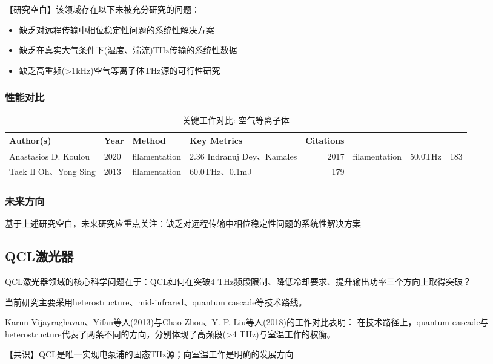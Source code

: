 \documentclass[reprint,amsmath,amssymb,aps,floatfix]{revtex4-2}
\begin{document}
\par\par{【研究空白】该领域存在以下未被充分研究的问题：}
\begin{itemize}
\item 缺乏对远程传输中相位稳定性问题的系统性解决方案
\item 缺乏在真实大气条件下(湿度、湍流)THz传输的系统性数据
\item 缺乏高重频(>1kHz)空气等离子体THz源的可行性研究
\end{itemize}

\subsubsection*{性能对比}
\begin{table}[h!]
\caption{关键工作对比: 空气等离子体}
\begin{tabular}{@{}llp{2.5cm}p{2.5cm}r@{}}
\hline
Author(s) & Year & Method & Key Metrics & Citations\\
\hline
Anastasios D. Koulou & 2020 & filamentation & 2.36%
Indranuj Dey、Kamales & 2017 & filamentation & 50.0THz & 183\\
Taek Il Oh、Yong Sing & 2013 & filamentation & 60.0THz、0.1mJ & 179\\
\hline
\end{tabular}
\end{table}

\subsubsection*{未来方向}
基于上述研究空白，未来研究应重点关注：缺乏对远程传输中相位稳定性问题的系统性解决方案

\subsection{QCL激光器}
\par\par{QCL激光器领域的核心科学问题在于：QCL如何在突破4 THz频段限制、降低冷却要求、提升输出功率三个方向上取得突破？}

\par\par{当前研究主要采用heterostructure、mid-infrared、quantum cascade等技术路线。}
\par\par{Karun Vijayraghavan、Yifan等人(2013)与Chao Zhou、Y. P. Liu等人(2018)的工作对比表明：}
在技术路径上，quantum cascade与heterostructure代表了两条不同的方向，分别体现了高频段(>4 THz)与室温工作的权衡。
\par\par{【共识】QCL是唯一实现电泵浦的固态THz源；向室温工作是明确的发展方向}
\end{document}
